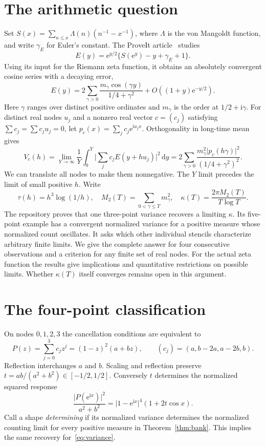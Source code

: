 \documentclass[11pt,letterpaper]{article}
\newcommand{\dd}{\,\mathrm d}
\newcommand{\ee}{\mathrm e}
\newcommand{\ii}{\mathrm i}
\newcommand{\abs}[1]{\lvert#1\rvert}
\begin{document}
\section{The arithmetic question}
Set $S(x)=\sum_{n\le x}\Lambda(n)(n^{-1}-x^{-1})$, where $\Lambda$ is the von Mangoldt function, and write $\gamma_{\!E}$ for Euler's constant. The ProveIt article~\cite{ProveIt} studies
\[
 E(y)=\ee^{y/2}\{S(\ee^y)-y+\gamma_{\!E}+1\}.
\]
Using its input for the Riemann zeta function, it obtains an absolutely convergent cosine series with a decaying error,
\[
 E(y)=2\sum_{\gamma>0}\frac{m_\gamma\cos(\gamma y)}{1/4+\gamma^2}+O((1+y)\ee^{-y/2}).
\]
Here $\gamma$ ranges over distinct positive ordinates and $m_\gamma$ is the order at $1/2+\ii\gamma$. For distinct real nodes $u_j$ and a nonzero real vector $c=(c_j)$ satisfying $\sum c_j=\sum c_j u_j=0$, let $p_c(x)=\sum_jc_j\ee^{\ii u_jx}$. Orthogonality in long-time mean gives
\begin{equation}\label{eq:variance}
 V_c(h)=\lim_{Y\to\infty}\frac1Y\int_0^Y\Big|\sum_jc_jE(y+hu_j)\Big|^2\dd y
   =2\sum_{\gamma>0}\frac{m_\gamma^2\abs{p_c(h\gamma)}^2}{(1/4+\gamma^2)^2}.
\end{equation}
We can translate all nodes to make them nonnegative. The $Y$ limit precedes the limit of small positive $h$. Write
\[
 \tau(h)=h^3\log(1/h),\quad M_2(T)=\sum_{0<\gamma\le T}m_\gamma^2,\quad
 \kappa(T)=\frac{2\pi M_2(T)}{T\log T}.
\]
The repository proves that one three-point variance recovers a limiting $\kappa$. Its five-point example has a convergent normalized variance for a positive measure whose normalized count oscillates. It asks which other individual stencils characterize arbitrary finite limits. We give the complete answer for four consecutive observations and a criterion for any finite set of real nodes. For the actual zeta function the results give implications and quantitative restrictions on possible limits. Whether $\kappa(T)$ itself converges remains open in this argument.

\section{The four-point classification}\label{sec:class}
On nodes $0,1,2,3$ the cancellation conditions are equivalent to
\[
 P(z)=\sum_{j=0}^3 c_jz^j=(1-z)^2(a+bz),\qquad (c_j)=(a,b-2a,a-2b,b).
\]
Reflection interchanges $a$ and $b$. Scaling and reflection preserve $t=ab/(a^2+b^2)\in[-1/2,1/2]$. Conversely $t$ determines the normalized squared response
\begin{equation}\label{eq:affine}
 \frac{\abs{P(\ee^{\ii x})}^2}{a^2+b^2}=\abs{1-\ee^{\ii x}}^4(1+2t\cos x).
\end{equation}
Call a shape \emph{determining} if its normalized variance determines the normalized counting limit for every positive measure in Theorem~\ref{thm:bank}. This implies the same recovery for~\eqref{eq:variance}.
\end{document}
